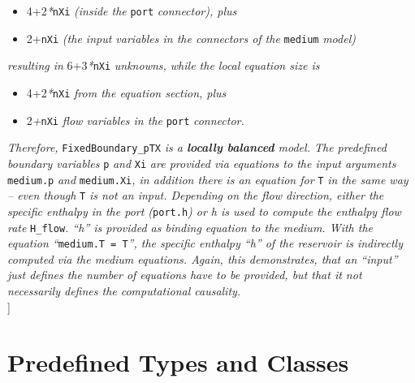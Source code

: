 \begin{itemize}
\item
  4+2\emph{*}\lstinline!nXi! \emph{(inside the} \lstinline!port! \emph{connector), plus}
\item
  2+\lstinline!nXi! \emph{(the input variables in the connectors of the} \lstinline!medium!
  \emph{model)}
\end{itemize}

\emph{resulting in} 6+3\emph{*}\lstinline!nXi! \emph{unknowns, while the local
equation size is}

\begin{itemize}
\item
  4+2\emph{*}\lstinline!nXi! \emph{from the equation section, plus}
\item
  2\emph{+}\lstinline!nXi! \emph{flow variables in the} \lstinline!port! \emph{connector.}
\end{itemize}

\emph{Therefore,} \lstinline!FixedBoundary_pTX! \emph{is a \textbf{locally
balanced} model. The predefined boundary variables} \lstinline!p! \emph{and} \lstinline!Xi!
\emph{are provided via equations to the input arguments} \lstinline!medium.p!
\emph{and} \lstinline!medium.Xi!\emph{, in addition there is an equation for} \lstinline!T!
\emph{in the same way -- even though} \lstinline!T! \emph{is not an input. Depending
on the flow direction, either the specific enthalpy in the port
(}\lstinline!port.h!\emph{) or h is used to compute the enthalpy flow rate}
\lstinline!H_flow!\emph{. ``h'' is provided as binding equation to the medium. With
the equation ``}\lstinline!medium.T = T!\emph{'', the specific enthalpy ``h'' of the
reservoir is indirectly computed via the medium equations. Again, this
demonstrates, that an ``input'' just defines the number of equations
have to be provided, but that it not necessarily defines the
computational causality.\\
}{]}

\section{Predefined Types and Classes}


